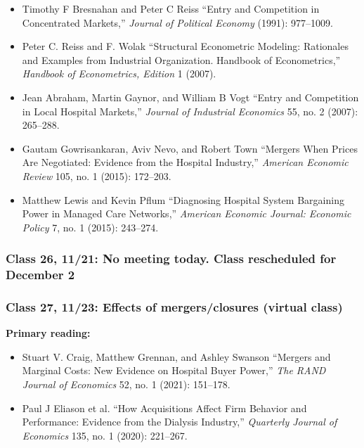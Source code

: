 \documentclass[11pt,]{article}
\providecommand{\tightlist}{%
  \setlength{\itemsep}{0pt}\setlength{\parskip}{0pt}}
\begin{document}
\begin{itemize}
\tightlist
\item
  Timothy F Bresnahan and Peter C Reiss {``Entry and Competition in
  Concentrated Markets,''} \emph{Journal of Political Economy} (1991):
  977--1009.
\item
  Peter C. Reiss and F. Wolak {``Structural Econometric Modeling:
  {Rationales} and Examples from Industrial Organization. {Handbook} of
  {Econometrics},''} \emph{Handbook of Econometrics, Edition} 1 (2007).
\item
  Jean Abraham, Martin Gaynor, and William B Vogt {``Entry and
  {Competition} in {Local} {Hospital} {Markets},''} \emph{Journal of
  Industrial Economics} 55, no. 2 (2007): 265--288.
\item
  Gautam Gowrisankaran, Aviv Nevo, and Robert Town {``Mergers {When}
  {Prices} {Are} {Negotiated}: {Evidence} from the {Hospital}
  {Industry},''} \emph{American Economic Review} 105, no. 1 (2015):
  172--203.
\item
  Matthew Lewis and Kevin Pflum {``Diagnosing {Hospital} {System}
  {Bargaining} {Power} in {Managed} {Care} {Networks},''} \emph{American
  Economic Journal: Economic Policy} 7, no. 1 (2015): 243--274.
\end{itemize}

\hypertarget{class-26-1121-no-meeting-today.-class-rescheduled-for-december-2}{%
\subsubsection{Class 26, 11/21: No meeting today. Class rescheduled for
December
2}\label{class-26-1121-no-meeting-today.-class-rescheduled-for-december-2}}

\hypertarget{class-27-1123-effects-of-mergersclosures-virtual-class}{%
\subsubsection{\texorpdfstring{Class 27, 11/23: Effects of
mergers/closures (\textbf{virtual
class})}{Class 27, 11/23: Effects of mergers/closures (virtual class)}}\label{class-27-1123-effects-of-mergersclosures-virtual-class}}

\textbf{Primary reading:}

\begin{itemize}
\tightlist
\item
  Stuart V. Craig, Matthew Grennan, and Ashley Swanson {``Mergers and
  Marginal Costs: {New} Evidence on Hospital Buyer Power,''} \emph{The
  RAND Journal of Economics} 52, no. 1 (2021): 151--178.
\item
  Paul J Eliason et al. {``How {Acquisitions} {Affect} {Firm} {Behavior}
  and {Performance}: {Evidence} from the {Dialysis} {Industry},''}
  \emph{Quarterly Journal of Economics} 135, no. 1 (2020): 221--267.
\end{itemize}
\end{document}
